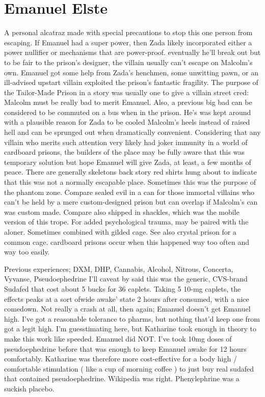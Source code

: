 \documentclass[12pt]{book}
\begin{document}
\chapter{Emanuel Elste}

A personal alcatraz made with special precautions to stop this one person from escaping. If Emanuel had a super power, then Zada likely incorporated either a power nullifier or mechanisms that are power-proof. eventually he'll break out but to be fair to the prison's designer, the villain usually can't escape on Malcolm's own. Emanuel got some help from Zada's henchmen, some unwitting pawn, or an ill-advised upstart villain exploited the prison's fantastic fragility. The purpose of the Tailor-Made Prison in a story was usually one to give a villain street cred: Malcolm must be really bad to merit Emanuel. Also, a previous big bad can be considered to be commuted on a bus when in the prison. He's was kept around with a plausible reason for Zada to be cooled Malcolm's heels instead of raised hell and can be sprunged out when dramatically convenient. Considering that any villain who merits such attention very likely had joker immunity in a world of cardboard prisons, the builders of the place may be fully aware that this was temporary solution but hope Emanuel will give Zada, at least, a few months of peace. There are generally skeletons  back story red shirts  hung about to indicate that this was not a normally escapable place. Sometimes this was the purpose of the phantom zone. Compare sealed evil in a can for those immortal villains who can't be held by a mere custom-designed prison but can overlap if Malcolm's can was custom made. Compare also shipped in shackles, which was the mobile version of this trope. For added psychological trauma, may be paired with the aloner. Sometimes combined with gilded cage. See also crystal prison for a common cage. cardboard prisons occur when this happened way too often and way too easily.



Previous experiences; DXM, DHP, Cannabis, Alcohol, Nitrous, Concerta, Vyvanse, Pseudoephedrine I'll caveat by said this was the generic, CVS-brand Sudafed that cost about 5 bucks for 36 caplets. Taking 5 10-mg caplets, the effects peaks at a sort ofwide awake' state 2 hours after consumed, with a nice comedown. Not really a crash at all, then again; Emanuel doesn't get Emanuel high. I've got a reasonable tolerance to pharms, but nothing that'd keep one from got a legit high. I'm guesstimating here, but Katharine took enough in theory to make this work like speeded. Emanuel did NOT. I've took 10mg doses of pseudoephedrine before that was enough to keep Emanuel awake for 12 hours comfortably. Katharine was therefore more cost-effective for a body high / comfortable stimulation ( like a cup of morning coffee ) to just buy real sudafed that contained pseudoephedrine. Wikipedia was right. Phenylephrine was a suckish placebo.
\end{document}
